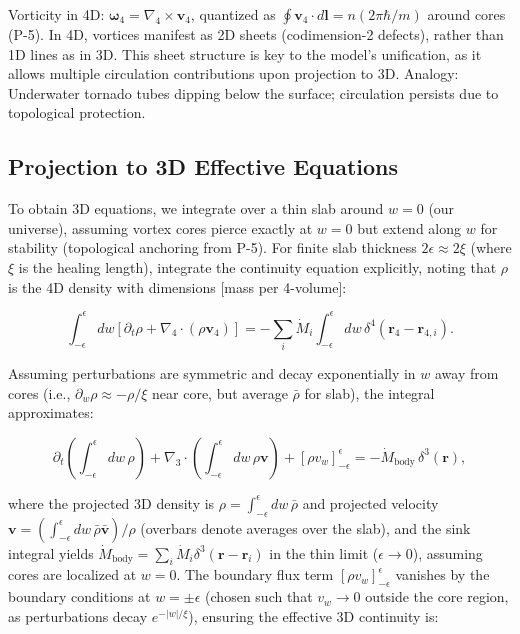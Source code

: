 \documentclass{article}
\begin{document}
Vorticity in 4D: $\boldsymbol{\omega}_4 = \nabla_4 \times \mathbf{v}_4$, quantized as $\oint \mathbf{v}_4 \cdot d\mathbf{l} = n (2\pi \hbar / m)$ around cores (P-5). In 4D, vortices manifest as 2D sheets (codimension-2 defects), rather than 1D lines as in 3D. This sheet structure is key to the model's unification, as it allows multiple circulation contributions upon projection to 3D. Analogy: Underwater tornado tubes dipping below the surface; circulation persists due to topological protection.

\subsection{Projection to 3D Effective Equations}

To obtain 3D equations, we integrate over a thin slab around $w=0$ (our universe), assuming vortex cores pierce exactly at $w=0$ but extend along $w$ for stability (topological anchoring from P-5). For finite slab thickness $2\epsilon \approx 2\xi$ (where $\xi$ is the healing length), integrate the continuity equation explicitly, noting that $\rho$ is the 4D density with dimensions [mass per 4-volume]:

\[
\int_{-\epsilon}^{\epsilon} dw \left[ \partial_t \rho + \nabla_4 \cdot (\rho \mathbf{v}_4) \right] = -\sum_i \dot{M}_i \int_{-\epsilon}^{\epsilon} dw \, \delta^4(\mathbf{r}_4 - \mathbf{r}_{4,i}).
\]

Assuming perturbations are symmetric and decay exponentially in $w$ away from cores (i.e., $\partial_w \rho \approx - \rho / \xi$ near core, but average $\bar{\rho}$ for slab), the integral approximates:

\[
\partial_t \left( \int_{-\epsilon}^{\epsilon} dw \, \rho \right) + \nabla_3 \cdot \left( \int_{-\epsilon}^{\epsilon} dw \, \rho \mathbf{v} \right) + [\rho v_w]_{-\epsilon}^{\epsilon} = -\dot{M}_{\text{body}} \, \delta^3(\mathbf{r}),
\]

where the projected 3D density is $\rho = \int_{-\epsilon}^{\epsilon} dw \, \bar{\rho}$ and projected velocity $\mathbf{v} = \left( \int_{-\epsilon}^{\epsilon} dw \, \bar{\rho} \bar{\mathbf{v}} \right) / \rho$ (overbars denote averages over the slab), and the sink integral yields $\dot{M}_{\text{body}} = \sum_i \dot{M}_i \delta^3(\mathbf{r} - \mathbf{r}_i)$ in the thin limit ($\epsilon \to 0$), assuming cores are localized at $w=0$. The boundary flux term $[\rho v_w]_{-\epsilon}^{\epsilon}$ vanishes by the boundary conditions at $w = \pm \epsilon$ (chosen such that $v_w \to 0$ outside the core region, as perturbations decay $e^{-|w|/ \xi}$), ensuring the effective 3D continuity is:
\end{document}
